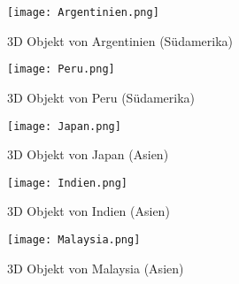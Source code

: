 \begin{figure}[!htb]
  \texttt{[image: Argentinien.png]}
  \caption{3D Objekt von Argentinien (Südamerika)}\label{fig:argentinien}
\endminipage\hfill
{}
  \texttt{[image: Peru.png]}
  \caption{3D Objekt von Peru (Südamerika)}\label{fig:peru}
\endminipage\hfill
\end{figure}

\begin{figure}[!htb]
  \texttt{[image: Japan.png]}
  \caption{3D Objekt von Japan (Asien)}\label{fig:japan}
\endminipage\hfill
{}
  \texttt{[image: Indien.png]}
  \caption{3D Objekt von Indien (Asien)}\label{fig:indien}
\endminipage\hfill
\end{figure}

\begin{figure}[!htb]
  \texttt{[image: Malaysia.png]}
  \caption{3D Objekt von Malaysia (Asien)}\label{fig:malaysia}
\endminipage\hfill
\end{figure}

